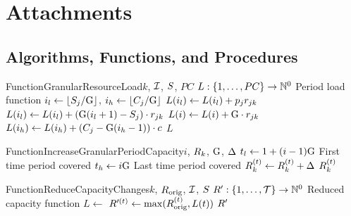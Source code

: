 \chapter{Attachments} \label{chap:attachments}

\section{Algorithms, Functions, and Procedures} \label{sec:attachments/algorithms-functions-procedures}


\begin{alg}{Function}{GranularResourceLoad}{$k$, $\mathcal{I}$, $S$, $PC$} \label{alg:granular-resource-load}
\State $L : \{{1}, \dots, {PC}\} \to \mathbb{N}^0$
       \Comment Period load function
    \State $i_l \gets \lfloor S_{j} / \mathrm{G} \rfloor$,
    \State $i_h \gets \lfloor C_{j} / \mathrm{G} \rfloor$
        \State $L(i_l) \gets L(i_l) + p_{j} r_{j k}$
    \Else
        \State $L(i_l) \gets L(i_l) + (\mathrm{G} (i_l + 1) - S_{j}) \cdot r_{j k}$
            \State $L(i) \gets L(i) + \mathrm{G} \cdot r_{j k}$
        \EndFor
        \State $L(i_h) \gets L(i_h) + (C_{j} - \mathrm{G} (i_h - 1)) \cdot c$
    \EndIf
\EndFor
\State \Return $L$
\end{alg}


\begin{alg}{Function}{IncreaseGranularPeriodCapacity}{$i$, $R_{k}$, $\mathrm{G}$, $\Delta$} \label{alg:increase-granular-period-capacity}
\State $t_l \gets 1+ (i-1)\mathrm{G}$
       \Comment First time period covered
\State $t_h \gets i \mathrm{G}$
       \Comment Last time period covered
    \State $\capacity{k}{t} \gets \capacity{k}{t} + \algImprovement$
\EndFor
\State \Return $\capacity{k}{t}$
\end{alg}


\begin{alg}{Function}{ReduceCapacityChanges}{$k$, $R_{\text{orig}}$, $\mathcal{I}$, $S$} \label{alg:reduce-capacity-changes}
\State $R_{}^\prime: \{{1}, \dots, {\mathcal{T}}\} \to \mathbb{N}^0$
       \Comment Reduced capacity function
\State $L \gets $ 
    \State $\capacity{}{t}^\prime \gets \max(\capacity{\text{orig}}{t}, L(t))$
\EndFor
\State \Return $R_{}^\prime$
\end{alg}


